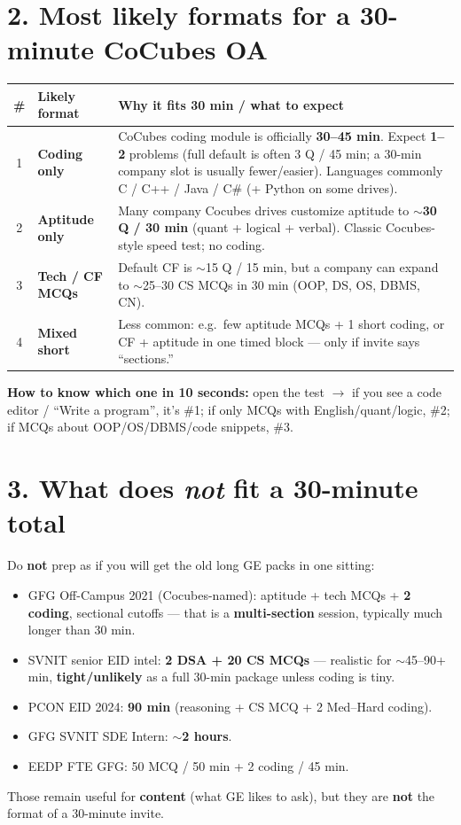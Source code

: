 \documentclass[a4paper,10pt]{article}
\begin{document}
\section{2. Most likely formats for a 30-minute CoCubes OA}
\begin{tabularx}{\textwidth}{@{}c >{\bfseries}p{3.2cm} X@{}}
\toprule
\textbf{\#} & \textbf{Likely format} & \textbf{Why it fits 30 min / what to expect} \\
\midrule
1 & \textbf{Coding only} & CoCubes coding module is officially \textbf{30--45 min}. Expect \textbf{1--2} problems (full default is often 3 Q / 45 min; a 30-min company slot is usually fewer/easier). Languages commonly C / C++ / Java / C\# (+ Python on some drives). \\
2 & \textbf{Aptitude only} & Many company Cocubes drives customize aptitude to \textbf{$\sim$30 Q / 30 min} (quant + logical + verbal). Classic Cocubes-style speed test; no coding. \\
3 & \textbf{Tech / CF MCQs} & Default CF is $\sim$15 Q / 15 min, but a company can expand to $\sim$25--30 CS MCQs in 30 min (OOP, DS, OS, DBMS, CN). \\
4 & \textbf{Mixed short} & Less common: e.g.\ few aptitude MCQs + 1 short coding, or CF + aptitude in one timed block --- only if invite says ``sections.'' \\
\bottomrule
\end{tabularx}

\vspace{1mm}
{\color{ok}\textbf{How to know which one in 10 seconds:}} open the test $\rightarrow$ if you see a code editor / ``Write a program'', it's \#1; if only MCQs with English/quant/logic, \#2; if MCQs about OOP/OS/DBMS/code snippets, \#3.

\section{3. What does \emph{not} fit a 30-minute total}
Do \textbf{not} prep as if you will get the old long GE packs in one sitting:
\begin{itemize}
  \item GFG Off-Campus 2021 (Cocubes-named): aptitude + tech MCQs + \textbf{2 coding}, sectional cutoffs --- that is a \textbf{multi-section} session, typically much longer than 30 min.
  \item SVNIT senior EID intel: \textbf{2 DSA + 20 CS MCQs} --- realistic for $\sim$45--90+ min, \textbf{tight/unlikely} as a full 30-min package unless coding is tiny.
  \item PCON EID 2024: \textbf{90 min} (reasoning + CS MCQ + 2 Med--Hard coding).
  \item GFG SVNIT SDE Intern: $\sim$\textbf{2 hours}.
  \item EEDP FTE GFG: 50 MCQ / 50 min + 2 coding / 45 min.
\end{itemize}
Those remain useful for \textbf{content} (what GE likes to ask), but they are \textbf{not} the format of a 30-minute invite.
\end{document}
